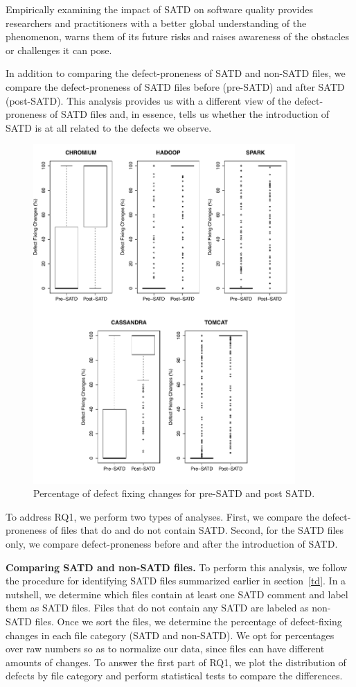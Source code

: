 Empirically examining the impact of SATD on software quality provides researchers and practitioners with a better global understanding of the phenomenon, warns them of its future risks and raises awareness of the obstacles or challenges it can pose.

In addition to comparing the defect-proneness of SATD and non-SATD files, we compare the defect-proneness of SATD files before (pre-SATD) and after SATD (post-SATD). This analysis provides us with a different view of the defect-proneness of SATD files and, in essence, tells us whether the introduction of SATD is at all related to the defects we observe.



\begin{figure}[tb]
	\centering
	\includegraphics[width=100mm]{figures/chapter3/rq1-2_correction}
	\caption{Percentage of defect fixing changes for  pre-SATD and post SATD.}
	\label{figure:preVpost}
\end{figure}

 To address RQ1, we perform two types of analyses. First, we compare the defect-proneness of files that do and do not contain SATD. Second, for the SATD files only, we compare defect-proneness before and after the introduction of SATD.

\noindent\textbf{Comparing SATD and non-SATD files.} To perform this analysis, we follow the procedure for identifying SATD files summarized earlier in section~\ref{td}. In a nutshell, we determine which files contain at least one SATD comment and label them as SATD files. Files that do not contain any SATD are labeled as non-SATD files. Once we sort the files, we determine the percentage of defect-fixing changes in each file category (SATD and non-SATD). We opt for percentages over raw numbers so as to normalize our data, since files can have different amounts of changes. To answer the first part of RQ1, we plot the distribution of defects by file category and perform statistical tests to compare the differences.

